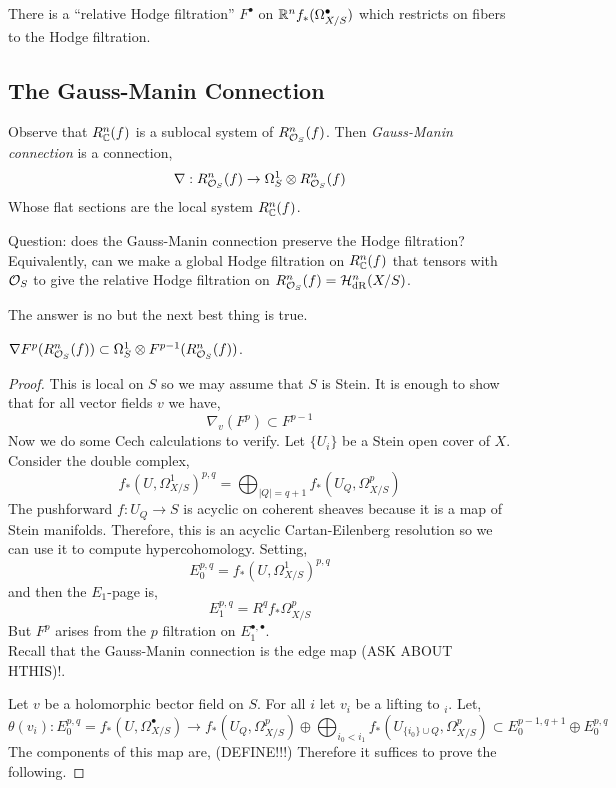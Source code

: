 \documentclass[12pt]{article}
\begin{document}
\begin{cor}
There is a ``relative Hodge filtration'' $F^\bullet$ on $\mathbb{R}^n f_* (\Omega^\bullet_{X/S})$ which restricts on fibers to the Hodge filtration.
\end{cor}

\subsection{The Gauss-Manin Connection}

\begin{defn}
Observe that $R^n_{\mathbb{C}}(f)$ is a sublocal system of $R^n_{\mathcal{O}_{S}}(f)$. Then \textit{Gauss-Manin connection} is a connection,
\[ \nabla : R^n_{\mathcal{O}_{S}}(f) \to \Omega^1_{S} \otimes R^n_{\mathcal{O}_{S}}(f) \]
Whose flat sections are the local system $R^n_{\mathbb{C}}(f)$. 
\end{defn}

\begin{rmk}
Question: does the Gauss-Manin connection preserve the Hodge filtration? Equivalently, can we make a global Hodge filtration on $R^n_{\mathbb{C}}(f)$ that tensors with $\mathcal{O}_{S}$ to give the relative Hodge filtration on $R^n_{\mathcal{O}_{S}}(f) = \mathcal{H}_{\mathrm{dR}}^{n}(X/S)$.
\end{rmk}

\begin{rmk}
The answer is no but the next best thing is true. 
\end{rmk}

\begin{theorem}
$\nabla F^p(R^n_{\mathcal{O}_{S}}(f)) \subset \Omega^1_S \otimes F^{p-1}(R^n_{\mathcal{O}_{S}}(f))$.
\end{theorem}

\begin{proof}
This is local on $S$ so we may assume that $S$ is Stein. It is enough to show that for all vector fields $v$ we have,
\[ \nabla_v (F^p) \subset F^{p-1} \]
Now we do some Cech calculations to verify. Let $\{ U_i \}$ be a Stein open cover of $X$. Consider the double complex,
\[ f_*(U, \Omega^1_{X/S})^{p,q} = \bigoplus_{|Q| = q + 1} f_* (U_Q, \Omega^p_{X/S}) \]
The pushforward $f : U_Q \to S$ is acyclic on coherent sheaves because it is a map of Stein manifolds. Therefore, this is an acyclic Cartan-Eilenberg resolution so we can use it to compute hypercohomology. Setting,
\[ E_0^{p,q} = f_*(U, \Omega^1_{X/S})^{p,q} \]
and then the $E_1$-page is,
\[ E_1^{p,q} = R^q f_* \Omega^p_{X/S} \]
But $F^p$ arises from the $p$ filtration on $E^{\bullet, \bullet}_1$. 
\bigskip\\
Recall that the Gauss-Manin connection is the edge map (ASK ABOUT HTHIS)!.



Let $v$ be a holomorphic bector field on $S$. For all $i$ let $v_i$ be a lifting to $_i$. Let,
\[ \theta(v_i) : E^{p,q}_0 = f_*(U, \Omega^\bullet_{X/S}) \to f_*(U_Q, \Omega^p_{X/S}) \oplus \bigoplus_{i_0 < i_1} f_*(U_{\{ i_0 \} \cup Q}, \Omega^p_{X/S}) \subset E_0^{p-1, q+1} \oplus E_0^{p,q} \]
The components of this map are,
(DEFINE!!!)
Therefore it suffices to prove the following.
\end{proof}
\end{document}
